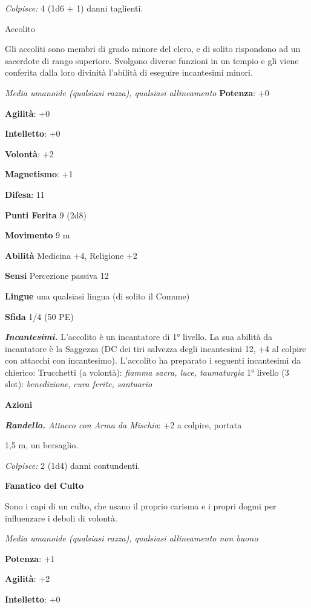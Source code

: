 \begin{multicols}{2}
\emph{Colpisce:} 4 (1d6 + 1) danni taglienti.

Accolito

Gli accoliti sono membri di grado minore del clero, e di solito
rispondono ad un sacerdote di rango superiore. Svolgono diverse funzioni
in un tempio e gli viene conferita dalla loro divinità l'abilità di
eseguire incantesimi minori.

\emph{Media umanoide (qualsiasi razza), qualsiasi allineamento}
\textbf{Potenza}: +0

\textbf{Agilità}: +0

\textbf{Intelletto}: +0

\textbf{Volontà}: +2

\textbf{Magnetismo}: +1

\textbf{Difesa}: 11

\textbf{Punti Ferita} 9 (2d8)

\textbf{Movimento} 9 m

\textbf{Abilità} Medicina +4, Religione +2

\textbf{Sensi} Percezione passiva 12

\textbf{Lingue} una qualsiasi lingua (di solito il Comune)

\textbf{Sfida} 1/4 (50 PE)

\emph{\textbf{Incantesimi.}} L'accolito è un incantatore di 1° livello.
La sua abilità da incantatore è la Saggezza (DC dei tiri salvezza degli
incantesimi 12, +4 al colpire con attacchi con incantesimo). L'accolito
ha preparato i seguenti incantesimi da chierico: Trucchetti (a volontà):
\emph{fiamma sacra, luce, taumaturgia} 1° livello (3 slot):
\emph{benedizione}, \emph{cura ferite, santuario}

\textbf{Azioni}


\emph{\textbf{Randello.} Attacco con Arma da Mischia}: +2 a colpire,
portata

1,5 m, un bersaglio.

\emph{Colpisce:} 2 (1d4) danni contundenti.


\textbf{Fanatico del Culto}

Sono i capi di un culto, che usano il proprio carisma e i propri dogmi
per influenzare i deboli di volontà.

\emph{Media umanoide (qualsiasi razza), qualsiasi allineamento non
buono}

\textbf{Potenza}: +1

\textbf{Agilità}: +2

\textbf{Intelletto}: +0


\end{multicols}
